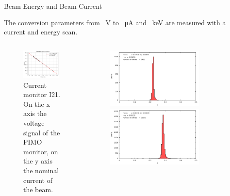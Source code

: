 \documentclass[9pt,a4paper]{beamer}
\begin{document}
\begin{frame}{Beam Energy and Beam Current}

The conversion parameters from \SI{}{\volt} to \SI{}{\micro \ampere} and \SI{}{\kilo \electronvolt} are measured with a current and energy scan.

\begin{columns}
\begin{column}{0.5\textwidth}
\begin{figure}
\includegraphics[width = 0.95\textwidth]{figures/I21.pdf}
\caption{ \footnotesize Current monitor I21. On the x axis the voltage signal of the PIMO monitor, on the y axis the nominal current of the beam.}
\end{figure}
\end{column}
\begin{column}{0.5\textwidth}
\begin{figure}
\includegraphics[width = 0.75\textwidth]{figures/ENMOvoltage15.pdf}
\includegraphics[width = 0.75\textwidth]{figures/ENMOvoltage20.pdf}

\end{figure}
\end{column}
\end{columns}
\end{frame}
\end{document}
